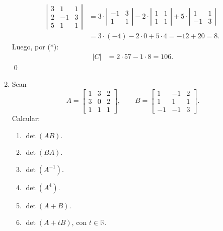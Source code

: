 \begin{enumerate}[topsep=6pt,itemsep=.4cm]
\begin{align*}
            \left|  \begin{matrix} 3&1&1\\ 2&-1&3 \\ 5&1&1\end{matrix} \right| &= 3\cdot  \left| \begin{matrix} -1&3\\ 1&1\end{matrix} \right| - 2\cdot  \left|  \begin{matrix} 1&1\\ 1&1\end{matrix} \right| + 5 \cdot  \left|  \begin{matrix} 1&1\\ -1&3\end{matrix} \right| \\
            &= 3\cdot (-4) - 2\cdot 0 + 5\cdot 4 = -12 + 20 = 8.
        \end{align*}
        Luego, por (*):
        \begin{align*}
            \left| C \right| &= 2 \cdot 57 -1 \cdot 8 = 106.
        \end{align*} 
        \qed
    
    \item Sean
            $$A=
        \begin{bmatrix} 1&3&2 \\ 3&0&2 \\  1&1&1 \end{bmatrix}, \qquad
        B =
        \begin{bmatrix} 1&-1&2\\ 1&1&1 \\ -1&-1&3 \end{bmatrix}.
        $$
        Calcular:
        \begin{multicols}{3}
        \begin{enumerate}
            \item\label{det-AB} $\det(AB)$.
            \item\label{det-BA} $\det(BA)$.
            \item\label{det-A-1} $\det(A^{-1})$.
            \item\label{det-A4} $\det(A^{4})$.
            \item\label{det-A+B} $\det(A+B)$.
            \item\label{det-A+tB} $\det(A+tB)$, con $t \in \mathbb{R}$.
        \end{enumerate}
    \end{multicols}
    \rta


\end{enumerate}
